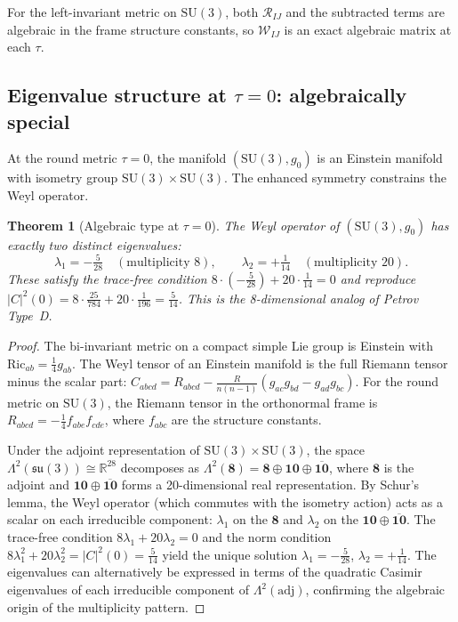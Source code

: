 \documentclass[12pt]{article}
\newtheorem{theorem}{Theorem}
\theoremstyle{definition}
\theoremstyle{remark}
\begin{document}
For the left-invariant metric on $\mathrm{SU}(3)$, both $\mathcal{R}_{IJ}$ and the subtracted terms are algebraic in the frame structure constants, so $\mathcal{W}_{IJ}$ is an exact algebraic matrix at each $\tau$.

\subsection{Eigenvalue structure at \texorpdfstring{$\tau=0$}{tau = 0}: algebraically special}

At the round metric $\tau=0$, the manifold $(\mathrm{SU}(3),g_0)$ is an Einstein manifold with isometry group $\mathrm{SU}(3)\times\mathrm{SU}(3)$.  The enhanced symmetry constrains the Weyl operator.

\begin{theorem}[Algebraic type at $\tau=0$]
\label{thm:typeD}
The Weyl operator of $(\mathrm{SU}(3),g_0)$ has exactly two distinct eigenvalues:
\begin{equation}
\lambda_1 = -\tfrac{5}{28} \quad (\text{multiplicity } 8), \qquad \lambda_2 = +\tfrac{1}{14} \quad (\text{multiplicity } 20).
\end{equation}
These satisfy the trace-free condition $8\cdot(-\tfrac{5}{28})+20\cdot\tfrac{1}{14}=0$ and reproduce $|C|^2(0)=8\cdot\tfrac{25}{784}+20\cdot\tfrac{1}{196}=\tfrac{5}{14}$.  This is the 8-dimensional analog of Petrov Type~D.
\end{theorem}

\begin{proof}
The bi-invariant metric on a compact simple Lie group is Einstein with $\mathrm{Ric}_{ab}=\frac{1}{4}g_{ab}$.  The Weyl tensor of an Einstein manifold is the full Riemann tensor minus the scalar part: $C_{abcd}=R_{abcd}-\frac{R}{n(n-1)}(g_{ac}g_{bd}-g_{ad}g_{bc})$.  For the round metric on $\mathrm{SU}(3)$, the Riemann tensor in the orthonormal frame is $R_{abcd}=-\frac{1}{4}f_{abe}f_{cde}$, where $f_{abc}$ are the structure constants.

Under the adjoint representation of $\mathrm{SU}(3)\times\mathrm{SU}(3)$, the space $\Lambda^2(\mathfrak{su}(3))\cong\mathbb{R}^{28}$ decomposes as $\Lambda^2(\mathbf{8})=\mathbf{8}\oplus\mathbf{10}\oplus\overline{\mathbf{10}}$, where $\mathbf{8}$ is the adjoint and $\mathbf{10}\oplus\overline{\mathbf{10}}$ forms a 20-dimensional real representation.  By Schur's lemma, the Weyl operator (which commutes with the isometry action) acts as a scalar on each irreducible component: $\lambda_1$ on the $\mathbf{8}$ and $\lambda_2$ on the $\mathbf{10}\oplus\overline{\mathbf{10}}$.  The trace-free condition $8\lambda_1+20\lambda_2=0$ and the norm condition $8\lambda_1^2+20\lambda_2^2=|C|^2(0)=\tfrac{5}{14}$ yield the unique solution $\lambda_1=-\tfrac{5}{28}$, $\lambda_2=+\tfrac{1}{14}$.  The eigenvalues can alternatively be expressed in terms of the quadratic Casimir eigenvalues of each irreducible component of $\Lambda^2(\mathrm{adj})$, confirming the algebraic origin of the multiplicity pattern.
\end{proof}
\end{document}
